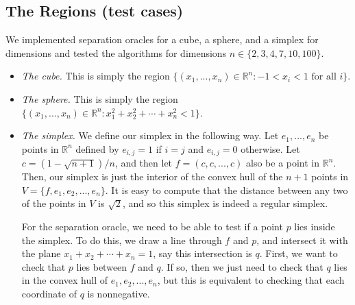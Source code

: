 \documentclass[11pt]{article}
\begin{document}
\subsection{The Regions (test cases)}

We implemented separation oracles for a cube, a sphere, and a simplex for dimensions and tested the algorithms for dimensions $n\in\{2,3,4,7,10,100\}$.
\begin{itemize}
\item \emph{The cube.} This is simply the region $\{(x_1,...,x_n) \in \mathbb{R}^n : -1 < x_i < 1\text{ for all }i\}$.
\item \emph{The sphere.} This is simply the region $\{(x_1,...,x_n)\in\mathbb{R}^n : x_1^2 + x_2^2 + \cdots + x_n^2 < 1\}$.
\item \emph{The simplex.} We define our simplex in the following way. Let $e_1,...,e_n$ be points in $\mathbb R^n$ defined by $e_{i,j} = 1$ if $i=j$ and $e_{i,j} = 0$ otherwise. Let $c = (1 - \sqrt{n+1}) / n$, and then let $f = (c,c,...,c)$ also be a point in $\mathbb R^n$. Then, our simplex is just the interior of the convex hull of the $n+1$ points in $V = \{f,e_1,e_2,...,e_n\}$. It is easy to compute that the distance between any two of the points in $V$ is $\sqrt{2}$, and so this simplex is indeed a regular simplex.

For the separation oracle, we need to be able to test if a point $p$ lies inside the simplex. To do this, we draw a line through $f$ and $p$, and intersect it with the plane $x_1 + x_2 + \cdots + x_n = 1$, say this intersection is $q$. First, we want to check that $p$ lies between $f$ and $q$. If so, then we just need to check that $q$ lies in the convex hull of $e_1,e_2,...,e_n$, but this is equivalent to checking that each coordinate of $q$ is nonnegative.
\end{itemize}
\end{document}
